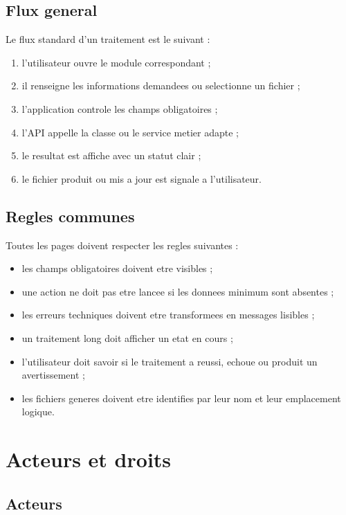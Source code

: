 \documentclass[11pt,a4paper]{report}
\begin{document}
\section{Flux general}

Le flux standard d'un traitement est le suivant :

\begin{enumerate}
  \item l'utilisateur ouvre le module correspondant ;
  \item il renseigne les informations demandees ou selectionne un fichier ;
  \item l'application controle les champs obligatoires ;
  \item l'API appelle la classe ou le service metier adapte ;
  \item le resultat est affiche avec un statut clair ;
  \item le fichier produit ou mis a jour est signale a l'utilisateur.
\end{enumerate}

\section{Regles communes}

Toutes les pages doivent respecter les regles suivantes :

\begin{itemize}
  \item les champs obligatoires doivent etre visibles ;
  \item une action ne doit pas etre lancee si les donnees minimum sont absentes ;
  \item les erreurs techniques doivent etre transformees en messages lisibles ;
  \item un traitement long doit afficher un etat en cours ;
  \item l'utilisateur doit savoir si le traitement a reussi, echoue ou produit un avertissement ;
  \item les fichiers generes doivent etre identifies par leur nom et leur emplacement logique.
\end{itemize}

\chapter{Acteurs et droits}

\section{Acteurs}
\end{document}
